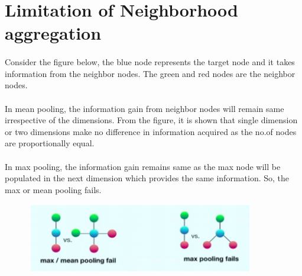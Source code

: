 \section{Limitation of Neighborhood aggregation}
\paragraph{}Consider the figure below, the blue node represents the target node and it takes information from the neighbor nodes. The green and red nodes are the neighbor nodes.
\paragraph{}In mean pooling, the information gain from neighbor nodes will remain same irrespective of the dimensions. From the figure, it is shown that single dimension or two dimensions make no difference in information acquired as the no.of nodes are proportionally equal.
\paragraph{}In max pooling, the information gain remains same as the max node will be populated in the next dimension which provides the same information. So, the max or mean pooling fails.

\begin{figure}[h]
    \centering
    \includegraphics[width=10cm,height=3cm]{tex/img/Limitation.png}
\end{figure}